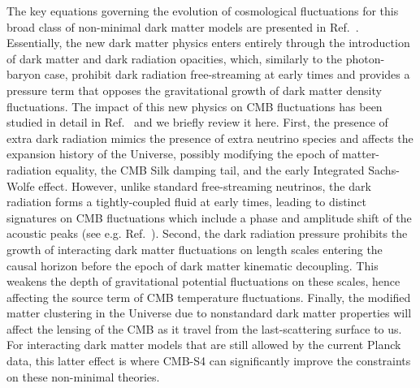 The key equations governing the evolution of cosmological fluctuations for this broad class of non-minimal dark matter models are presented in Ref.~\cite{Cyr-Racine:2015ihg}. Essentially, the new dark matter physics enters entirely through the introduction of dark matter and dark radiation opacities, which, similarly to the photon-baryon case, prohibit dark radiation free-streaming at early times and provides a pressure term that opposes the gravitational growth of dark matter density fluctuations. The impact of this new physics on CMB fluctuations has been studied in detail in Ref.~\cite{Cyr-Racine:2013fsa} and we briefly review it here. First, the presence of extra dark radiation mimics the presence of extra neutrino species and affects the expansion history of the Universe, possibly modifying the epoch of matter-radiation equality, the CMB Silk damping tail, and the early Integrated Sachs-Wolfe effect. However, unlike standard free-streaming neutrinos, the dark radiation forms a tightly-coupled fluid at early times, leading to distinct signatures on CMB fluctuations which include a phase and amplitude shift of the acoustic peaks (see e.g. Ref.~\cite{Bashinsky:2003tk,Cyr-Racine:2013jua,Follin:2015hya}). Second, the dark radiation pressure prohibits the growth of interacting dark matter fluctuations on length scales entering the causal horizon before the epoch of dark matter kinematic decoupling. This weakens the depth of gravitational potential fluctuations on these scales, hence affecting the source term of CMB temperature fluctuations. Finally, the modified matter clustering in the Universe due to nonstandard dark matter properties will affect the lensing of the CMB as it travel from the last-scattering surface to us. For interacting dark matter models that are still allowed by the current Planck data, this latter effect is where CMB-S4 can significantly improve the constraints on these non-minimal theories.


